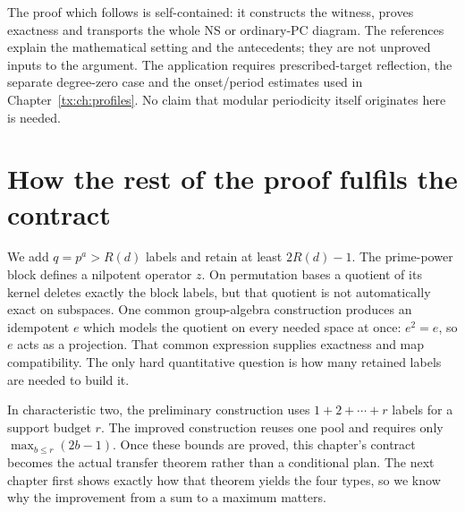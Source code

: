 The proof which follows is self-contained: it constructs the witness,
proves exactness and transports the whole NS or ordinary-PC diagram.
The references explain the mathematical setting and the antecedents;
they are not unproved inputs to the argument. The application requires
prescribed-target reflection, the separate degree-zero case and the
onset/period estimates used in Chapter~\ref{tx:ch:profiles}. No claim
that modular periodicity itself originates here is needed.

\section{How the rest of the proof fulfils the contract}
We add $q=p^a>R(d)$ labels and retain at least $2R(d)-1$.
The prime-power block defines a nilpotent operator $z$. On permutation
bases a quotient of its kernel deletes exactly the block labels, but
that quotient is not automatically exact on subspaces. One common
group-algebra construction produces an idempotent $e$ which models the quotient
on every needed space at once: $e^2=e$, so $e$ acts as a projection.
That common expression supplies exactness
and map compatibility. The only hard quantitative question is how many
retained labels are needed to build it.

In characteristic two, the preliminary construction uses $1+2+\cdots+r$ labels for a support
budget $r$. The improved construction reuses one pool and requires only
$\max_{b\le r}(2b-1)$. Once these bounds are proved, this chapter's
contract becomes the actual transfer theorem rather than a conditional
plan. The next chapter first shows exactly how that theorem yields the
four types, so we know why the improvement from a sum to a maximum matters.
